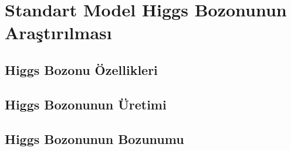 \chapter{Standart Model Higgs Bozonunun Araştırılması}

\section{Higgs Bozonu Özellikleri}

\section{Higgs Bozonunun Üretimi}

\section{Higgs Bozonunun Bozunumu}
